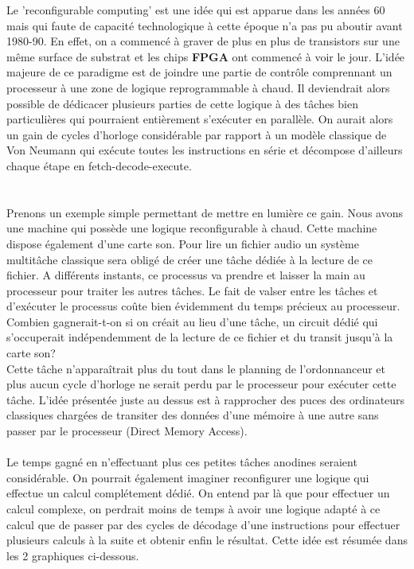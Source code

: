 \vspace{15px}
Le 'reconfigurable computing' est une idée qui est apparue dans les années 60 mais qui faute de capacité technologique à cette époque n'a pas pu aboutir avant 1980-90. En effet, on a commencé à graver de plus en plus de transistors sur une même surface de substrat et les chips {\bf FPGA} ont commencé à voir le jour.
L'idée majeure de ce paradigme est de joindre une partie de contrôle comprennant un processeur à une zone de logique reprogrammable à chaud. Il deviendrait alors possible de dédicacer plusieurs parties de cette logique à des tâches bien particulières qui pourraient entièrement s’exécuter en parallèle. On aurait alors un gain de cycles d'horloge considérable par rapport à un modèle classique de Von Neumann qui exécute toutes les instructions en série et décompose d'ailleurs chaque étape en fetch-decode-execute.\\
\\
\\
Prenons un exemple simple permettant de mettre en lumière ce gain. Nous avons une machine qui possède une logique reconfigurable à chaud. Cette machine dispose également d'une carte son. Pour lire un fichier audio un système multitâche classique sera obligé de créer une tâche dédiée à la lecture de ce fichier. A différents instants, ce processus va prendre et laisser la main au processeur pour traiter les autres tâches. Le fait de valser entre les tâches et d'exécuter le processus coûte bien évidemment du temps précieux au processeur. Combien gagnerait-t-on si on créait au lieu d'une tâche, un circuit dédié qui s'occuperait indépendemment de la lecture de ce fichier et du transit jusqu'à la carte son?\\
Cette tâche n'apparaîtrait plus du tout dans le planning de l'ordonnanceur et plus aucun cycle d'horloge ne serait perdu par le processeur pour exécuter cette tâche. L'idée présentée juste au dessus est à rapprocher des puces des ordinateurs classiques chargées de transiter des données d'une mémoire à une autre sans passer par le processeur (Direct Memory Access).\\
\\
Le temps gagné en n'effectuant plus ces petites tâches anodines seraient considérable. On pourrait également imaginer reconfigurer une logique qui effectue un calcul complétement dédié. On entend par là que pour effectuer un calcul complexe, on perdrait moins de temps à avoir une logique adapté à ce calcul que de passer par des cycles de décodage d'une instructions pour effectuer plusieurs calculs à la suite et obtenir enfin le résultat. Cette idée est résumée dans les 2 graphiques ci-dessous.\\
